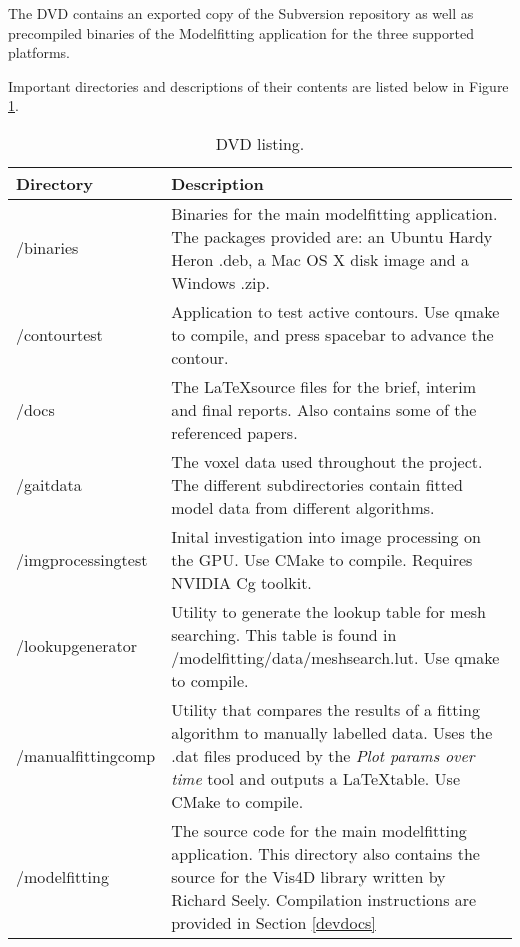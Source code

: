 The DVD contains an exported copy of the Subversion repository as well as precompiled binaries of the Modelfitting application for the three supported platforms.

Important directories and descriptions of their contents are listed below in Figure \ref{dvdlisting}.

\begin{table}[thb]
	\centering
	\begin{tabular}{|l|p{8cm}|}
		\hline
		Directory & Description \\
		\hline
		/binaries & Binaries for the main modelfitting application.
			The packages provided are: an Ubuntu Hardy Heron .deb, a Mac OS X disk image and a Windows .zip. \\
		/contourtest & Application to test active contours.
			Use qmake to compile, and press spacebar to advance the contour. \\
		/docs & The \LaTeX source files for the brief, interim and final reports.
			Also contains some of the referenced papers. \\
		/gaitdata & The voxel data used throughout the project.
			The different subdirectories contain fitted model data from different algorithms. \\
		/imgprocessingtest & Inital investigation into image processing on the GPU.
			Use CMake to compile.
			Requires NVIDIA Cg toolkit. \\
		/lookupgenerator & Utility to generate the lookup table for mesh searching.
			This table is found in /modelfitting/data/meshsearch.lut.
			Use qmake to compile. \\
		/manualfittingcomp & Utility that compares the results of a fitting algorithm to manually labelled data.
			Uses the .dat files produced by the \emph{Plot params over time} tool and outputs a \LaTeX table.
			Use CMake to compile. \\
		/modelfitting & The source code for the main modelfitting application.
			This directory also contains the source for the Vis4D library written by Richard Seely.
			Compilation instructions are provided in Section \ref{devdocs} \\
		\hline
	\end{tabular}
	\caption{DVD listing.}
	\label{dvdlisting}
\end{table}
